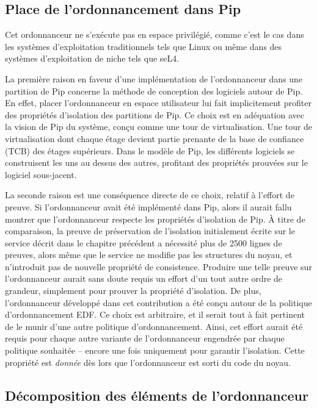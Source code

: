 		\subsection{Place de l'ordonnancement dans Pip}

		Cet ordonnanceur ne s'exécute pas en espace privilégié, comme c'est le cas dans les systèmes d'exploitation traditionnels tels que Linux ou même dans des systèmes d'exploitation de niche tels que seL4. 

		La première raison en faveur d'une implémentation de l'ordonnanceur dans une partition de Pip concerne la méthode de conception des logiciels autour de Pip. En effet, placer l'ordonnanceur en espace utilisateur lui fait implicitement profiter des propriétés d'isolation des partitions de Pip. Ce choix est en adéquation avec la vision de Pip du système, conçu comme une tour de virtualisation. Une tour de virtualisation dont chaque étage devient partie prenante de la base de confiance (TCB) des étages supérieurs. Dans le modèle de Pip, les différents logiciels se construisent les uns au dessus des autres, profitant des propriétés prouvées sur le logiciel sous-jacent.

		La seconde raison est une conséquence directe de ce choix, relatif à l'effort de preuve. Si l'ordonnanceur avait été implémenté dans Pip, alors il aurait fallu montrer que l'ordonnanceur respecte les propriétés d'isolation de Pip. À titre de comparaison, la preuve de préservation de l'isolation initialement écrite sur le service décrit dans le chapitre précédent a nécessité plus de 2500 lignes de preuves, alors même que le service ne modifie pas les structures du noyau, et n'introduit pas de nouvelle propriété de consistence. Produire une telle preuve sur l'ordonnanceur aurait sans doute requis un effort d'un tout autre ordre de grandeur, simplement pour prouver la propriété d'isolation. De plus, l'ordonnanceur développé dans cet contribution a été conçu autour de la politique d'ordonnancement EDF. Ce choix est arbitraire, et il serait tout à fait pertinent de le munir d'une autre politique d'ordonnancement. Ainsi, cet effort aurait été requis pour chaque autre variante de l'ordonnanceur engendrée par chaque politique souhaitée -- encore une fois uniquement pour garantir l'isolation. Cette propriété est \emph{donnée} dès lors que l'ordonnanceur est sorti du code du noyau.

		\subsection{Décomposition des éléments de l'ordonnanceur}
		\label{sec:project_overview}
